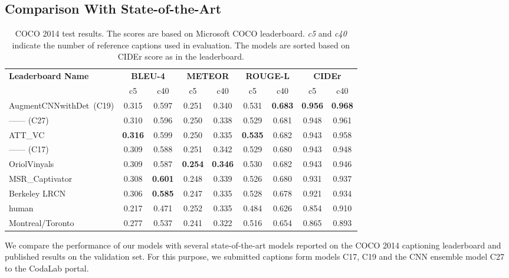 \subsection{Comparison With State-of-the-Art}
\begin{table}[tbh]
  \newcommand{\mct}[1]{%
    \multicolumn{2}{c|}{\bf#1}}
  \centering
  \begin{adjustbox}{center}
  \begin{tabular}{|l|c|c|c|c|c|c|c|c|}
    \hline\hline
    \multirow{2}{*}{\bf Leaderboard Name}
                       &\mct{BLEU-4} &\mct{METEOR} &\mct{ROUGE-L}&\mct{CIDEr}\\\cline{2-9}
                    & c5    & c40   &  c5   & c40   & c5  &  c40  &  c5  &  c40 \\\hline\hline
    AugmentCNNwithDet~(C19)& 0.315 & 0.597 & 0.251 &0.340& 0.531 &\bf0.683&\bf0.956&\bf0.968\\
    ------ (C27) & 0.310 & 0.596 & 0.250 &0.338& 0.529 & 0.681& 0.948& 0.961\\
    ATT\_VC~\cite{you2016image}& \bf0.316&0.599 & 0.250 &0.335&\bf0.535&0.682& 0.943& 0.958\\
    ------ (C17)  &  0.309 & 0.588 & 0.251 &0.342& 0.529 & 0.680& 0.943& 0.948\\
    OriolVinyals~\cite{Vinyals_2015_CVPR}      & 0.309 & 0.587 &\bf0.254&\bf0.346& 0.530 & 0.682& 0.943& 0.946\\
    MSR\_Captivator~\cite{Fang2015}  & 0.308 &\bf0.601& 0.248 &0.339& 0.526 & 0.680& 0.931& 0.937\\
    Berkeley LRCN~\cite{donahue2015long}   & 0.306 &\bf0.585& 0.247 &0.335& 0.528 & 0.678& 0.921& 0.934\\
    human~\cite{Chen2015}   & 0.217 & 0.471 & 0.252 &0.335& 0.484 & 0.626 & 0.854 & 0.910\\
    Montreal/Toronto~\cite{Xu2015show} & 0.277 & 0.537 & 0.241 &0.322& 0.516 & 0.654 & 0.865 & 0.893\\
    \hline \hline
  \end{tabular}
  \end{adjustbox}
  \caption{COCO 2014 test results. The scores are based on Microsoft
          COCO leaderboard. \emph{c5} and \emph{c40} indicate the number
  of reference captions used in evaluation. The models are sorted
  based on CIDEr score as in the leaderboard.}
  \label{tab:resCocLeaderTest}
\end{table}

We compare the performance of our models with several state-of-the-art
models reported on the COCO 2014 captioning leaderboard and published results on
the validation set.
For this purpose, we submitted captions form models C17, C19 and the CNN
ensemble model C27 to the CodaLab portal.

